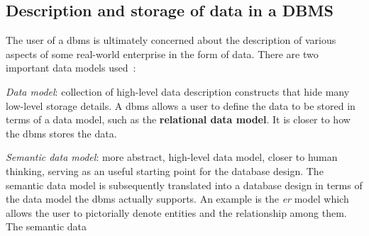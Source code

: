 \subsection{Description and storage of data in a DBMS}
\label{sec:descr-stor-data}
The user of a \gls{dbms} is ultimately concerned about the description of
various aspects of some real-world enterprise in the form of data. There are two
important data models used~\cite{ramakrishnan2003database}:
\begin{item-c}
\item \emph{Data model}: collection of high-level data description constructs
  that hide many low-level storage details. A \gls{dbms} allows a user to define
  the data to be stored in terms of a data model, such as the \textbf{relational
  data model}. It is closer to how the \gls{dbms} stores the data.
\item \emph{Semantic data model}: more abstract, high-level data model, closer
  to human thinking, serving as an useful starting point for the database
  design. The semantic data model is subsequently translated into a database
  design in terms of the data model the \gls{dbms} actually supports.
  An example is the \emph{\acrfull{er}} model which allows the user to
  pictorially denote entities and the relationship among them. The semantic data
\end{item-c}

